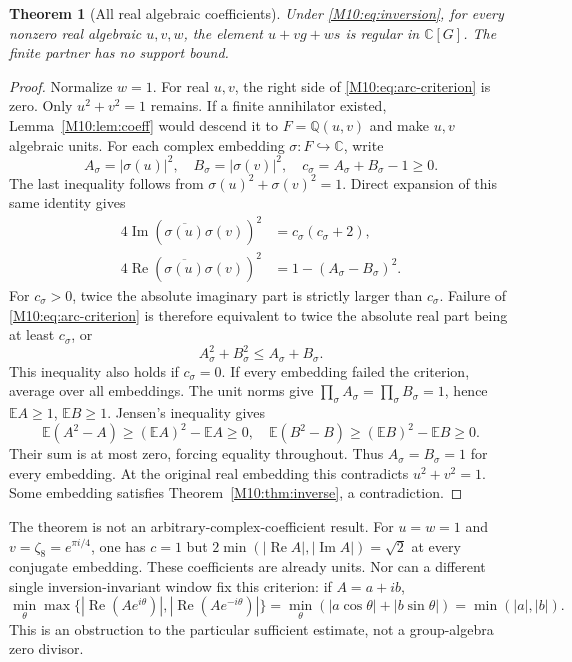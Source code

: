 \documentclass[11pt,a4paper,oneside]{report}
\newtheorem{theorem}{Theorem}[section]
\theoremstyle{definition}
\theoremstyle{remark}
\DeclareMathOperator{\Rea}{Re}
\DeclareMathOperator{\Ima}{Im}
\newcommand{\C}{\mathbb C}
\newcommand{\Q}{\mathbb Q}
\begin{document}
\begin{theorem}[All real algebraic coefficients]\label{M10:thm:real}
Under \eqref{M10:eq:inversion}, for every nonzero real algebraic
$u,v,w$, the element $u+vg+ws$ is regular in $\C[G]$.
The finite partner has no support bound.
\end{theorem}
\begin{proof}
Normalize $w=1$. For real $u,v$, the right side of
\eqref{M10:eq:arc-criterion} is zero. Only $u^2+v^2=1$ remains.
If a finite annihilator existed, Lemma~\ref{M10:lem:coeff} would
descend it to $F=\Q(u,v)$ and make $u,v$ algebraic units.
For each complex embedding $\sigma:F\hookrightarrow\C$, write
\[
A_\sigma=|\sigma(u)|^2,\quad
B_\sigma=|\sigma(v)|^2,\quad c_\sigma=A_\sigma+B_\sigma-1\ge0.
\]
The last inequality follows from $\sigma(u)^2+\sigma(v)^2=1$.
Direct expansion of this same identity gives
\begin{align*}
4\Ima(\overline{\sigma(u)}\sigma(v))^2
 &=c_\sigma(c_\sigma+2),\\
4\Rea(\overline{\sigma(u)}\sigma(v))^2
 &=1-(A_\sigma-B_\sigma)^2.
\end{align*}
For $c_\sigma>0$, twice the absolute imaginary part is strictly
larger than $c_\sigma$. Failure of \eqref{M10:eq:arc-criterion}
is therefore equivalent to twice the absolute real part being
at least $c_\sigma$, or
\[
A_\sigma^2+B_\sigma^2\le A_\sigma+B_\sigma.
\]
This inequality also holds if $c_\sigma=0$.
If every embedding failed the criterion, average over all embeddings.
The unit norms give $\prod_\sigma A_\sigma=
\prod_\sigma B_\sigma=1$, hence $\mathbb E A\ge1$,
$\mathbb E B\ge1$. Jensen's inequality gives
\[
\mathbb E(A^2-A)\ge(\mathbb EA)^2-\mathbb EA\ge0,
\quad
\mathbb E(B^2-B)\ge(\mathbb EB)^2-\mathbb EB\ge0.
\]
Their sum is at most zero, forcing equality throughout.
Thus $A_\sigma=B_\sigma=1$ for every embedding. At the original
real embedding this contradicts $u^2+v^2=1$.
Some embedding satisfies Theorem~\ref{M10:thm:inverse}, a contradiction.
\end{proof}

The theorem is not an arbitrary-complex-coefficient result.
For $u=w=1$ and $v=\zeta_8=e^{\pi i/4}$, one has $c=1$ but
$2\min(|\Rea A|,|\Ima A|)=\sqrt2$ at every conjugate embedding.
These coefficients are already units. Nor can a different single
inversion-invariant window fix this criterion: if $A=a+ib$,
\[
\min_\theta\max\{|\Rea(Ae^{i\theta})|,
|\Rea(Ae^{-i\theta})|\}
=\min_\theta(|a\cos\theta|+|b\sin\theta|)
=\min(|a|,|b|).
\]
This is an obstruction to the particular sufficient estimate,
not a group-algebra zero divisor.
\end{document}

